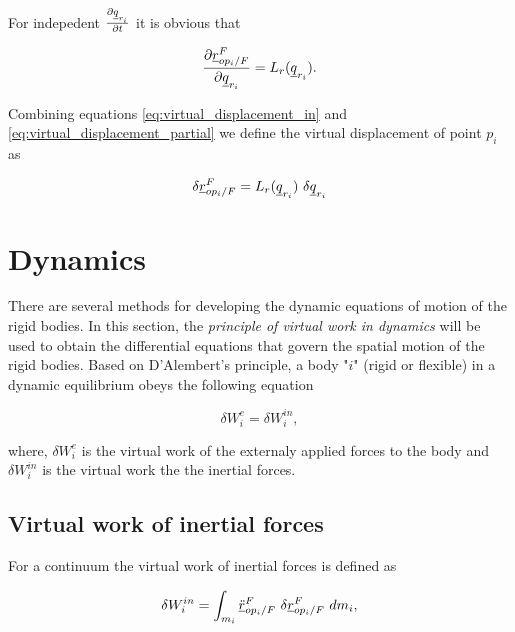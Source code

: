 For indepedent $\frac{\partial \underline{q}_{r_{i}}}{\partial t}$ it is obvious that 

\begin{equation}
    \frac{\partial \pvec{r}{op_{i}}{F}{F}}{\partial \vecd{q}_{r_{i}}}
    = L_{r}(\vecd{q}_{r_{i}}).
    \label{eq:virtual_displacement_partial}
\end{equation}

Combining equations \eqref{eq:virtual_displacement_in} and 
\eqref{eq:virtual_displacement_partial} we define the virtual displacement of 
point $p_{i}$ as  

\begin{equation}
    \delta \pvec{r}{op_{i}}{F}{F} = L_{r}(\vecd{q}_{r_{i}})\ \delta \vecd{q}_{r_{i}}
    \label{eq:virtual_displacement}
\end{equation}

\section{Dynamics}

There are several methods for developing the dynamic equations of motion of
the rigid bodies. In this section, the \textit{principle of virtual work in dynamics} 
will
be used to obtain the differential equations that govern the spatial motion of
the rigid bodies. Based on D'Alembert's principle, a body "$i$" (rigid or flexible) 
in a dynamic equilibrium obeys the following equation

\begin{equation}
    \delta W^{e}_{i} = \delta W^{in}_{i},
    \label{eq:principle_of_virtual_work}
\end{equation}

where, $\delta W^{e}_{i}$ is the virtual work of the externaly applied forces 
to the body and $\delta W^{in}_{i}$ is the virtual work the the inertial forces.

\subsection{Virtual work of inertial forces}
For a continuum the virtual work of inertial forces is defined as 

\begin{equation}
    \delta W^{in}_{i} = 
    \int_{m_i} \pvec{\ddot{r}}{op_{i}}{F}{F} \  \delta\pvec{r}{op_{i}}{F}{F} \ dm_{i},
    \label{eq:virtual_work_inertial_definition}
\end{equation}

